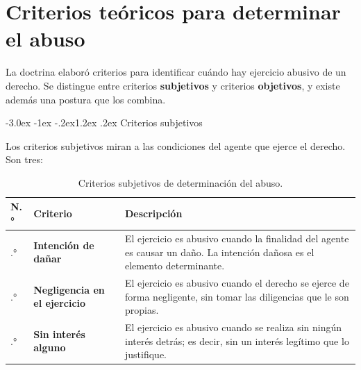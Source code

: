 \documentclass[12pt,oneside]{book}
\makeatletter
\renewcommand\section{\@startsection{section}{1}{\z@}%
  {-3.0ex \@plus -1ex \@minus -.2ex}{1.2ex \@plus .2ex}%
  {\normalfont\large\bfseries\color{acento}}}
\makeatother
\begin{document}

\chapter{Criterios teóricos para determinar el abuso}

La doctrina elaboró criterios para identificar cuándo hay ejercicio abusivo de un derecho. Se distingue entre criterios \textbf{subjetivos} y criterios \textbf{objetivos}, y existe además una postura que los combina.

\section{Criterios subjetivos}

Los criterios subjetivos miran a las condiciones del agente que ejerce el derecho. Son tres:

\begin{table}[H]
\centering
\begin{tabularx}{\textwidth}{
    >{\centering\arraybackslash}p{1cm}
    >{\raggedright\arraybackslash}p{4.2cm}
    >{\raggedright\arraybackslash}X
}
\toprule
\textbf{N.°} & \textbf{Criterio} & \textbf{Descripción} \\
\midrule
1.° & \textbf{Intención de dañar} & El ejercicio es abusivo cuando la finalidad del agente es causar un daño. La intención dañosa es el elemento determinante. \\
\addlinespace
2.° & \textbf{Negligencia en el ejercicio} & El ejercicio es abusivo cuando el derecho se ejerce de forma negligente, sin tomar las diligencias que le son propias. \\
\addlinespace
3.° & \textbf{Sin interés alguno} & El ejercicio es abusivo cuando se realiza sin ningún interés detrás; es decir, sin un interés legítimo que lo justifique. \\
\bottomrule
\end{tabularx}
\caption{Criterios subjetivos de determinación del abuso.}
\end{table}

\end{document}
